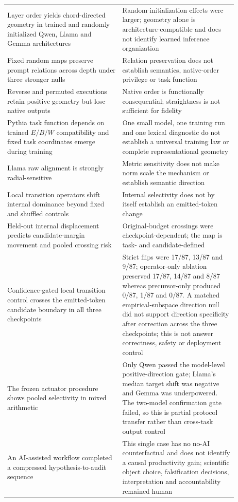 \documentclass[10pt]{article}
\begin{document}
\begin{longtable}{@{}>{\RaggedRight\arraybackslash}p{0.470\linewidth}>{\RaggedRight\arraybackslash}p{0.470\linewidth}@{}}
Layer order yields chord-directed geometry in trained and randomly initialized Qwen, Llama and Gemma architectures & Random-initialization effects were larger; geometry alone is architecture-compatible and does not identify learned inference organization \\
Fixed random maps preserve prompt relations across depth under three stronger nulls & Relation preservation does not establish semantics, native-order privilege or task function \\
Reverse and permuted executions retain positive geometry but lose native outputs & Native order is functionally consequential; straightness is not sufficient for fidelity \\
Pythia task function depends on trained \(E/B/W\) compatibility and fixed task coordinates emerge during training & One small model, one training run and one lexical diagnostic do not establish a universal training law or complete representational geometry \\
Llama raw alignment is strongly radial-sensitive & Metric sensitivity does not make norm scale the mechanism or establish semantic direction \\
Local transition operators shift internal dominance beyond fixed and shuffled controls & Internal selectivity does not by itself establish an emitted-token change \\
Held-out internal displacement predicts candidate-margin movement and pooled crossing risk & Original-budget crossings were checkpoint-dependent; the map is task- and candidate-defined \\
Confidence-gated local transition control crosses the emitted-token candidate boundary in all three checkpoints & Strict flips were 17/87, 13/87 and 9/87; operator-only ablation preserved 17/87, 14/87 and 8/87 whereas precursor-only produced 0/87, 1/87 and 0/87. A matched empirical-subspace direction null did not support direction specificity after correction across the three checkpoints; this is not answer correctness, safety or deployment control \\
The frozen actuator procedure shows pooled selectivity in mixed arithmetic & Only Qwen passed the model-level positive-direction gate; Llama's median target shift was negative and Gemma was underpowered. The two-model confirmation gate failed, so this is partial protocol transfer rather than cross-task output control \\
An AI-assisted workflow completed a compressed hypothesis-to-audit sequence & This single case has no no-AI counterfactual and does not identify a causal productivity gain; scientific object choice, falsification decisions, interpretation and accountability remained human \\
\end{longtable}
\end{document}
